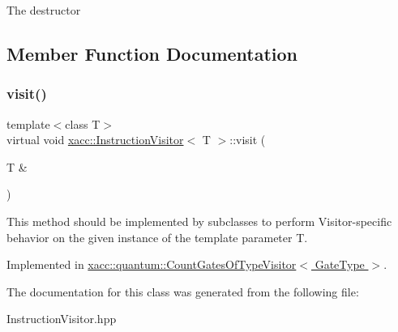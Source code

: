 The destructor 

\subsection{Member Function Documentation}
\mbox{\label{a01143_af0fead298f5bfbb8e6680433063e2c4b}} 
\subsubsection{\texorpdfstring{visit()}{visit()}}
{\footnotesize\ttfamily template$<$class T$>$ \\
virtual void \hyperlink{a01143}{xacc\+::\+Instruction\+Visitor}$<$ T $>$\+::visit (\begin{DoxyParamCaption}\item[{T \&}]{ }\end{DoxyParamCaption})\hspace{0.3cm}{\ttfamily [pure virtual]}}

This method should be implemented by subclasses to perform Visitor-\/specific behavior on the given instance of the template parameter T. 

Implemented in \hyperlink{a01063_a9c40e6cb4b74e2d6714c531ffc3b2909}{xacc\+::quantum\+::\+Count\+Gates\+Of\+Type\+Visitor$<$ Gate\+Type $>$}.



The documentation for this class was generated from the following file\+:\begin{DoxyCompactItemize}
\item 
Instruction\+Visitor.\+hpp\end{DoxyCompactItemize}
